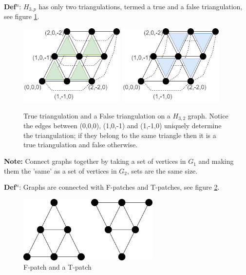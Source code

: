 \documentclass[a4paper,11pt]{report}
\begin{document}
\textbf{Def$^n$}: $H_{3,p}$ has only two triangulations, termed a true and a false triangulation, see figure \ref{truefalsetri}. 

\begin{figure}[h!]
\begin{center}
\includegraphics[height=40mm]{figures/holyer_true_triangulation.png}
\includegraphics[height=40mm]{figures/holyer_false_triangulation.png}
\end{center}
\caption{True triangulation and a False triangulation on a $H_{3,2}$ graph. Notice the edges between (0,0,0), (1,0,-1) and (1,-1,0) uniquely determine the triangulation; if they belong to the same triangle then it is a true triangulation and false otherwise.}
\label{truefalsetri}
\end{figure}

\textbf{Note:} Connect graphs together by taking a set of vertices in $G_1$ and making them the 'same' as a set of vertices in $G_2$, sets are the same size.

\textbf{Def$^n$}: Graphs are connected with F-patches and T-patches, see figure \ref{patches}. 

\begin{figure}[h!]
\begin{center}
\includegraphics[width=70mm]{figures/patches.png}
\end{center}
\caption{F-patch and a T-patch}
\label{patches}
\end{figure}
\end{document}
